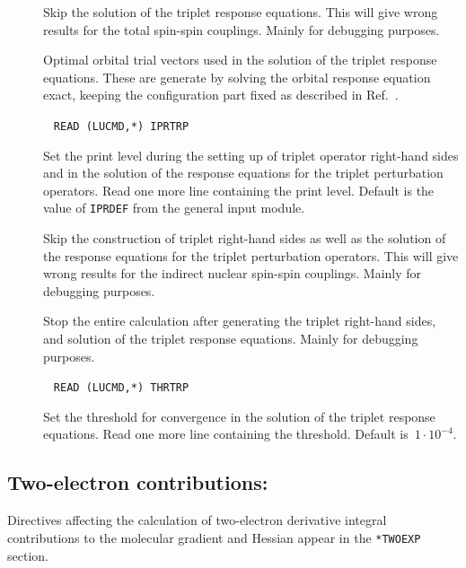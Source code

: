 \begin{description}
\item[] Skip the solution of the triplet response
equations. This will give wrong results for the total spin-spin
couplings. Mainly for debugging purposes.

\item[] Optimal orbital
trial vectors used in the 
solution of the triplet response equations. These are generate by
solving the orbital response equation 
exact, keeping the configuration part fixed as described in
Ref.~\cite{tuhjahjajpjjcp84}. 

\item[]\verb| |\newline
\verb|READ (LUCMD,*) IPRTRP|

Set the print level during the setting up of triplet operator
right-hand sides and in the solution of the response equations for
the triplet perturbation operators. Read one more line containing the
print level. Default is the value of \verb|IPRDEF| from the
general input module.

\item[] Skip the construction of triplet right-hand
sides as well as the solution of the response equations for
the triplet perturbation operators. This will give wrong results for
the indirect nuclear spin-spin
couplings. Mainly for debugging 
purposes.

\item[] Stop the entire calculation after generating the
triplet right-hand sides, and solution of the triplet response
equations. Mainly for debugging purposes.

\item[]\verb| |\newline
\verb|READ (LUCMD,*) THRTRP|

Set the threshold for convergence in the solution of the triplet
response equations. Read one more line containing the
threshold. Default is~$1\cdot10^{-4}$.
\end{description}

\subsection{Two-electron contributions: }

Directives affecting the calculation of two-electron derivative
integral contributions to the molecular gradient and
Hessian appear in 
the \verb|*TWOEXP| section.  

